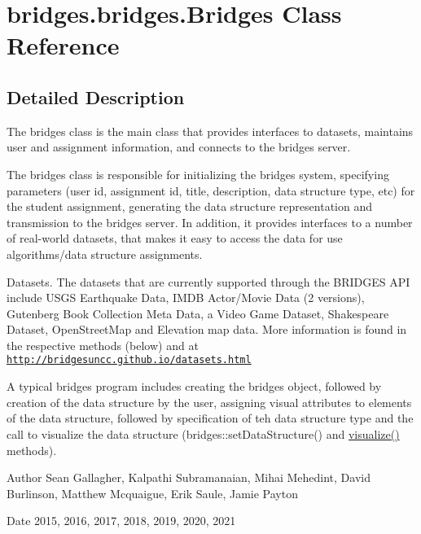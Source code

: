 \hypertarget{classbridges_1_1bridges_1_1_bridges}{}\section{bridges.\+bridges.\+Bridges Class Reference}
\label{classbridges_1_1bridges_1_1_bridges}


\subsection{Detailed Description}
The bridges class is the main class that provides interfaces to datasets, maintains user and assignment information, and connects to the bridges server. 

The bridges class is responsible for initializing the bridges system, specifying parameters (user id, assignment id, title, description, data structure type, etc) for the student assignment, generating the data structure representation and transmission to the bridges server. In addition, it provides interfaces to a number of real-\/world datasets, that makes it easy to access the data for use algorithms/data structure assignments. ~\newline


Datasets. The datasets that are currently supported through the B\+R\+I\+D\+G\+ES A\+PI include U\+S\+GS Earthquake Data, I\+M\+DB Actor/\+Movie Data (2 versions), Gutenberg Book Collection Meta Data, a Video Game Dataset, Shakespeare Dataset, Open\+Street\+Map and Elevation map data. More information is found in the respective methods (below) and at \href{http://bridgesuncc.github.io/datasets.html}{\tt http\+://bridgesuncc.\+github.\+io/datasets.\+html} 

A typical bridges program includes creating the bridges object, followed by creation of the data structure by the user, assigning visual attributes to elements of the data structure, followed by specification of teh data structure type and the call to visualize the data structure (bridges\+::set\+Data\+Structure() and \hyperlink{classbridges_1_1bridges_1_1_bridges_a3c1321f8be7b249639a47eba10b67c70}{visualize()} methods).

\begin{DoxyAuthor}{Author}
Sean Gallagher, Kalpathi Subramanaian, Mihai Mehedint, David Burlinson, Matthew Mcquaigue, Erik Saule, Jamie Payton
\end{DoxyAuthor}
\begin{DoxyDate}{Date}
2015, 2016, 2017, 2018, 2019, 2020, 2021 
\end{DoxyDate}
